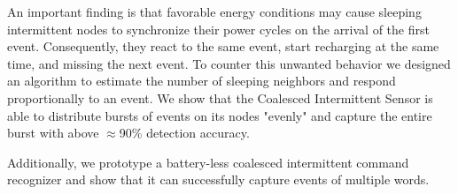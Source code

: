 \documentclass[sigconf, anonymous]{acmart}
\newcommand{\fullsys}{Coalesced Intermittent Sensor\xspace}
\newcommand{\fullcim}{coalesced intermittent command recognizer\xspace}
\begin{document}
An important finding is that favorable energy conditions may cause sleeping intermittent nodes to synchronize their power cycles on the arrival of the first event. Consequently, they react to the same event, start recharging at the same time, and missing the next event. To counter this unwanted behavior we designed an algorithm to estimate the number of sleeping neighbors and respond proportionally to an event. We show that the \fullsys is able to distribute bursts of events on its nodes "evenly" and capture the entire burst with above $\approx$90\% detection accuracy.
 
Additionally, we prototype a battery-less \fullcim and show that it can successfully capture events of multiple words. 



\end{document}
